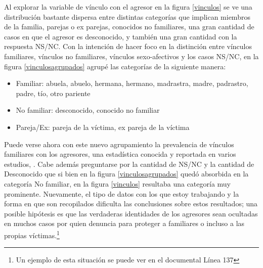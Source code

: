 \documentclass[10 pt]{article}
\begin{document}
Al explorar la variable de vínculo con el agresor en la figura \ref{vinculos} se ve una distribución bastante dispersa entre distintas categorías que implican miembros de la familia, parejas o ex parejas, conocidos no familiares, una gran cantidad de casos en que el agresor es desconocido, y también una gran cantidad con la respuesta NS/NC. Con la intención de hacer foco en la distinción entre vínculos familiares, vínculos no familiares, vínculos sexo-afectivos y los casos NS/NC, en la figura \ref{vinculosagrupados} agrupé las categorías de la siguiente manera: 

\begin{itemize}
    \item Familiar: abuela, abuelo, hermana, hermano, madrastra, madre, padrastro, padre, tío, otro pariente
    \item No familiar: desconocido, conocido no familiar
    \item Pareja/Ex: pareja de la víctima, ex pareja de la víctima
\end{itemize}

Puede verse ahora con este nuevo agrupamiento la prevalencia de vínculos familiares con los agresores, una estadística conocida y reportada en varios estudios\citep{argentina2016analisis}, \citep{contreras2016violencia}. Cabe además preguntarse por la cantidad de NS/NC y la cantidad de Desconocido que si bien en la figura \ref{vinculosagrupados} quedó absorbida en la categoría No familiar, en la figura \ref{vinculos} resultaba una categoría muy prominente. Nuevamente, el tipo de datos con los que estoy trabajando y la forma en que son recopilados dificulta las conclusiones sobre estos resultados; una posible hipótesis es que las verdaderas identidades de los agresores sean ocultadas en muchos casos por quien denuncia para proteger a familiares o incluso a las propias víctimas.\footnote{Un ejemplo de esta situación se puede ver en el documental Línea 137\citep{vasallo2020linea137}}
\end{document}
